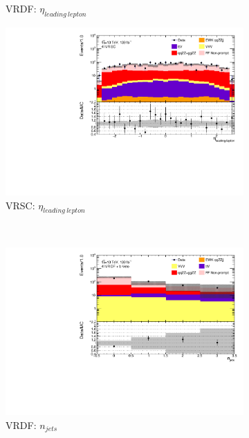 \begin{figure}[!htbp]
\begin{subfigure}{.49\textwidth}
        \caption{VRDF: $\eta_{leading~lepton}$ \label{fig:AllDataMCYield_VRDF_eta1} }
    \end{subfigure}
    \begin{subfigure}{.49\textwidth}
        \centering
        \includegraphics[width = 0.85\linewidth]{figures/Analysis/Background/Overlay_VRSC_FFApplied_eta1.pdf}
        \caption{VRSC: $\eta_{leading~lepton}$ \label{fig:AllDataMCYield_VRSC_eta1} }
    \end{subfigure}\\
    \begin{subfigure}{.49\textwidth}
        \centering
        \includegraphics[width = 0.85\linewidth]{figures/Analysis/Background/Overlay_VRDF_FFApplied_n_jets.pdf}
        \caption{VRDF: $n_{jets}$ \label{fig:AllDataMCYield_VRDF_njet} }
    \end{subfigure}
    \begin{subfigure}{.49\textwidth}
        \centering

\end{subfigure}
\end{figure}
